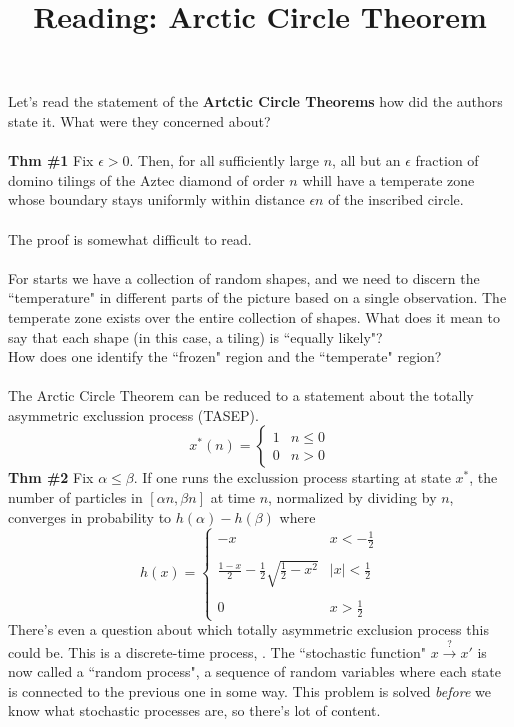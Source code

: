 \documentclass[12pt]{article}
\title{Reading: Arctic Circle Theorem}
\date{}
\begin{document}
\sffamily

\maketitle

\noindent Let's read the statement of the \textbf{Artctic Circle Theorems}  how did the authors state it.  What were they concerned about?  \\ \\
\textbf{Thm \#1}  Fix $\epsilon > 0$.  Then, for all sufficiently large $n$, all but an $\epsilon$ fraction of domino tilings of the Aztec diamond of order $n$ whill have a temperate zone whose boundary stays uniformly within distance $\epsilon n$ of the inscribed circle. \\ \\
The proof is somewhat difficult to read. \\ \\
For starts we have a collection of random shapes, and we need to discern the ``temperature" in different parts of the picture based on a single observation.  The temperate zone exists over the entire collection of shapes.  What does it mean to say that each shape (in this case, a tiling) is ``equally likely"? \\ How does one identify the ``frozen" region and the ``temperate" region? \\ \\
The Arctic Circle Theorem can be reduced to a statement about the totally asymmetric exclussion process (TASEP). 
$$ x^*(n) = \left\{ \begin{array}{cc} 1 & n \leq 0\\ 0 & n > 0\end{array} \right. $$
\textbf{Thm \#2} Fix $\alpha \leq \beta$.  If one runs the exclussion process starting at state $x^*$, the number of particles in $[\alpha n , \beta n ]$ at time $n$, normalized by dividing by $n$, converges in probability to $h(\alpha) - h(\beta)$ where
$$ h(x) = \left\{ \begin{array}{cr}  -x & x < - \frac{1}{2} \\ \\ \frac{1-x}{2} - \frac{1}{2}\sqrt{\frac{1}{2} - x^2} & |x| < \frac{1}{2} \\ \\ 0 & x > \frac{1}{2} \end{array} \right. $$
There's even a question about which totally asymmetric exclusion process this could be.  This is a discrete-time process, .  The ``stochastic function" $x \stackrel{?}{\to} x'$ is now called a ``random process", a sequence of random variables where each state is connected to the previous one in some way.  This problem is solved \textit{before} we know what stochastic processes are, so there's lot of content. \\ \\
\end{document}
